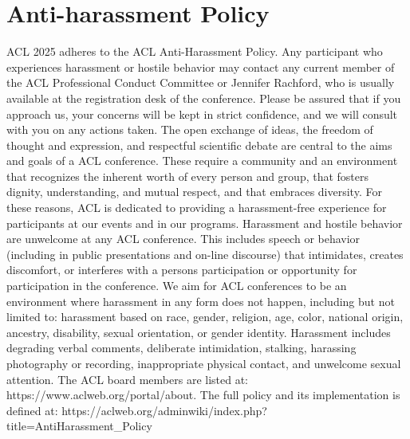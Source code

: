 \chapter{Anti-harassment Policy}
\vspace*{0.2cm}

ACL 2025 adheres to the ACL Anti-Harassment Policy. Any participant who experiences harassment or hostile behavior may contact any current member of the ACL Professional Conduct Committee or Jennifer Rachford, who is usually available at the registration desk of the conference. Please be assured that if you approach us, your concerns will be kept in strict confidence, and we will consult with you on any actions taken. The open exchange of ideas, the freedom of thought and expression, and respectful scientific debate are central to the aims and goals of a ACL conference. These require a community and an environment that recognizes the inherent worth of every person and group, that fosters dignity, understanding, and mutual respect, and that embraces diversity. For these reasons, ACL is dedicated to providing a harassment-free experience for participants at our events and in our programs. 
Harassment and hostile behavior are unwelcome at any ACL conference. This includes speech or behavior (including in public presentations and on-line discourse) that intimidates, creates discomfort, or interferes with a persons participation or opportunity for participation in the conference. We aim for ACL conferences to be an environment where harassment in any form does not happen, including but not limited to: harassment based on race, gender, religion, age, color, national origin, ancestry, disability, sexual orientation, or gender identity. 
Harassment includes degrading verbal comments, deliberate intimidation, stalking, harassing photography or recording, inappropriate physical contact, and unwelcome sexual attention. 
The ACL board members are listed at: https://www.aclweb.org/portal/about. 
The full policy and its implementation is defined at: https://aclweb.org/adminwiki/index.php?title=Anti\-Harassment\_Policy
